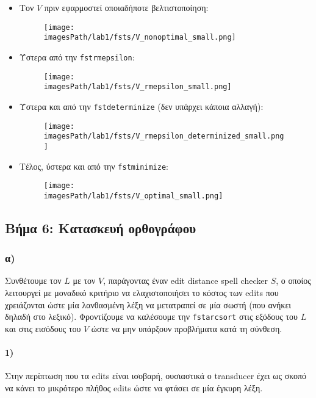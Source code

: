\documentclass[a4paper, 12pt]{article}
\newcommand{\imagesPath}{.}
\begin{document}
        	\begin{itemize}
        		\item Τον $V$ πριν εφαρμοστεί οποιαδήποτε βελτιστοποίηση:
        			\begin{figure}[H]
        				\texttt{[image: \\imagesPath/lab1/fsts/V\_nonoptimal\_small.png]}
        			\end{figure}
				\item Ύστερα από την \verb|fstrmepsilon|:
					\begin{figure}[H]
						\texttt{[image: \\imagesPath/lab1/fsts/V\_rmepsilon\_small.png]}
					\end{figure}
				\item Ύστερα και από την \verb|fstdeterminize| (δεν υπάρχει κάποια αλλαγή):
					\begin{figure}[H]
						\texttt{[image: \\imagesPath/lab1/fsts/V\_rmepsilon\_determinized\_small.png]}
					\end{figure}
				\item Τέλος, ύστερα και από την \verb|fstminimize|:
					\begin{figure}[H]
						\texttt{[image: \\imagesPath/lab1/fsts/V\_optimal\_small.png]}
					\end{figure}
        	\end{itemize}
        
    \subsection*{Βήμα 6: Κατασκευή ορθογράφου}
        \subsubsection*{α)}
        	Συνθέτουμε τον $L$ με τον $V$, παράγοντας έναν edit distance spell checker $S$, ο οποίος  λειτουργεί με μοναδικό κριτήριο να ελαχιστοποιήσει το κόστος των edits που χρειάζονται ώστε μία λανθασμένη λέξη να μετατραπεί σε μία σωστή (που ανήκει δηλαδή στο λεξικό). Φροντίζουμε να καλέσουμε την \verb|fstarcsort| στις εξόδους του $L$ και στις εισόδους του $V$ ώστε να μην υπάρξουν προβλήματα κατά τη σύνθεση. 
        	
            \paragraph{1)}
            	Στην περίπτωση που τα edits είναι ισοβαρή, ουσιαστικά ο transducer έχει ως σκοπό να κάνει το μικρότερο πλήθος edits ώστε να φτάσει σε μία έγκυρη λέξη.
\end{document}
